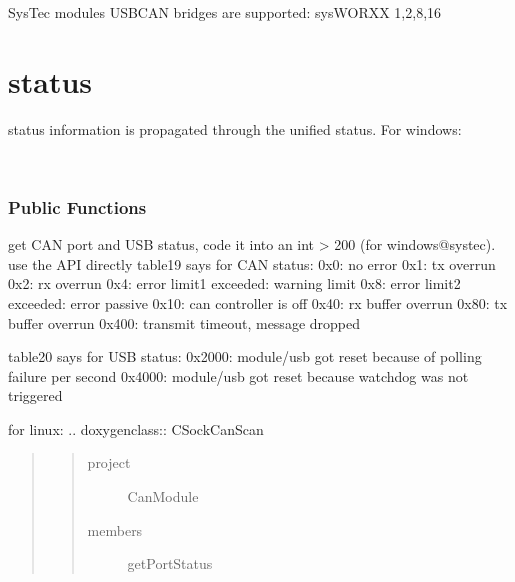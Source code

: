 \documentclass[a4paper,10pt,english]{sphinxmanual}
\begin{document}
SysTec modules USB\sphinxhyphen{}CAN bridges are supported: sysWORXX 1,2,8,16


\section{status}
\label{\detokenize{vendors/systec:status}}
status information is propagated through the unified status.
For windows:

\begin{fulllineitems}
\label{\detokenize{vendors/systec:_CPPv49STCanScan}}%
\pysigstartmultiline
{}%
\pysigstopmultiline~\subsubsection*{Public Functions}

\begin{fulllineitems}
\label{\detokenize{vendors/systec:_CPPv4N9STCanScan13getPortStatusEv}}%
\pysigstartmultiline
{}%
\pysigstopmultiline
get CAN port and USB status, code it into an int \textgreater{} 200 (for windows@systec). use the API directly table19 says for CAN status: 0x0: no error 0x1: tx overrun 0x2: rx overrun 0x4: error limit1 exceeded: warning limit 0x8: error limit2 exceeded: error passive 0x10: can controller is off 0x40: rx buffer overrun 0x80: tx buffer overrun 0x400: transmit timeout, message dropped

table20 says for USB status: 0x2000: module/usb got reset because of polling failure per second 0x4000: module/usb got reset because watchdog was not triggered 

\end{fulllineitems}


\end{fulllineitems}


for linux:
.. doxygenclass:: CSockCanScan
\begin{quote}
\begin{quote}\begin{description}
\item[{project}] \leavevmode
CanModule

\item[{members}] \leavevmode
getPortStatus

\end{description}\end{quote}
\end{quote}
\end{document}
